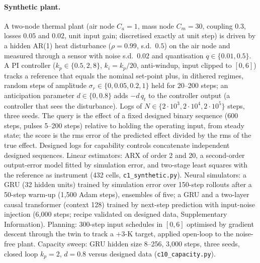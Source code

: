 \documentclass[11pt]{article}
\begin{document}
\paragraph{Synthetic plant.} A two-node thermal plant (air node $C_a=1$, mass node $C_m=30$, coupling $0.3$, losses $0.05$ and $0.02$, unit input gain; discretised exactly at unit step) is driven by a hidden AR(1) heat disturbance ($\rho=0.99$, s.d.\ $0.5$) on the air node and measured through a sensor with noise s.d.\ $0.02$ and quantisation $q\in\{0.01,0.5\}$. A PI controller ($k_p\in\{0.5,2,8\}$, $k_i=k_p/20$, anti-windup, input clipped to $[0,6]$) tracks a reference that equals the nominal set-point plus, in dithered regimes, random steps of amplitude $\sigma_r\in\{0,0.05,0.2,1\}$ held for 20--200 steps; an anticipation parameter $d\in\{0,0.8\}$ adds $-d\,q_t$ to the controller output (a controller that sees the disturbance). Logs of $N\in\{2{\cdot}10^3,2{\cdot}10^4,2{\cdot}10^5\}$ steps, three seeds. The query is the effect of a fixed designed binary sequence (600 steps, pulses 5--200 steps) relative to holding the operating input, from steady state; the score is the rms error of the predicted effect divided by the rms of the true effect. Designed logs for capability controls concatenate independent designed sequences. Linear estimators: ARX of order 2 and 20, a second-order output-error model fitted by simulation error, and two-stage least squares with the reference as instrument (432 cells, \texttt{c1\_synthetic.py}). Neural simulators: a GRU (32 hidden units) trained by simulation error over 150-step rollouts after a 50-step warm-up (1,500 Adam steps), ensembles of five; a GRU and a two-layer causal transformer (context 128) trained by next-step prediction with input-noise injection (6,000 steps; recipe validated on designed data, Supplementary Information). Planning: 300-step input schedules in $[0,6]$ optimised by gradient descent through the twin to track a $+3$-K target, applied open-loop to the noise-free plant. Capacity sweep: GRU hidden size 8--256, 3,000 steps, three seeds, closed loop $k_p=2$, $d=0.8$ versus designed data (\texttt{c10\_capacity.py}).
\end{document}
